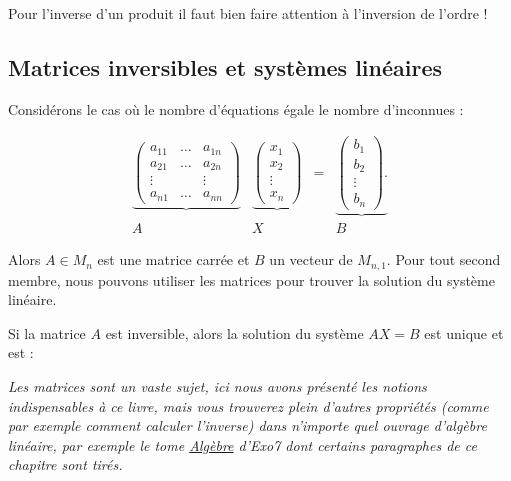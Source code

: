 \documentclass[11pt,class=report,crop=false]{standalone}
\begin{document}
Pour l'inverse d'un produit il faut bien faire attention à l'inversion de l'ordre !



\subsection{Matrices inversibles et systèmes linéaires}


Considérons le cas où le nombre d'équations égale le nombre d'inconnues :

\begin{equation*}\begin{array}{cccc}
		\underbrace{
			\left(
			\begin{array}{ccc}
				a_{11} & \dots & a_{1n}\\
				a_{21} & \dots & a_{2n}\\
				\vdots &&\vdots\\
				a_{n1} &\dots & a_{nn}
			\end{array}
			\right)
		}
		&
		\underbrace{
			\left(
			\begin{array}{c}
				x_1\\
				x_2\\
				\vdots\\
				x_n
			\end{array}
			\right)
		}
		& = &
		\underbrace{
			\left(
			\begin{array}{c}
				b_1\\
				b_2\\
				\vdots\\
				b_n
			\end{array}
			\right).
		}
		\\
		A & X & & B
\end{array}\end{equation*}


Alors $A \in M_n$ est une matrice carrée et
$B$ un vecteur de $M_{n,1}$.
Pour tout second membre, nous pouvons utiliser les matrices
pour trouver la solution du système linéaire.
\begin{proposition}
	Si la matrice $A$ est inversible, alors
	la solution du système $AX=B$ est unique et est :
\end{proposition}



\bigskip
\bigskip

\emph{
Les matrices sont un vaste sujet, ici nous avons présenté les notions indispensables à ce livre, mais vous trouverez plein d'autres propriétés (comme par exemple comment calculer l'inverse) dans n'importe quel ouvrage d'algèbre linéaire, par exemple le tome \href{http://exo7.emath.fr/cours/livre-algebre-1.pdf}{\emph{Algèbre}} d'Exo7 dont certains paragraphes de ce chapitre sont tirés.
}
\end{document}
